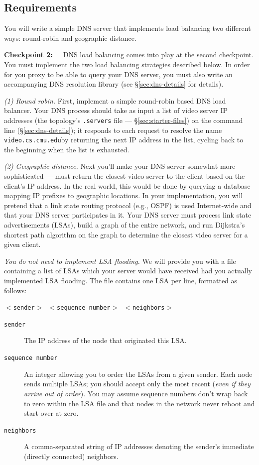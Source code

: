 \documentclass{article}
\newcommand{\theurl}{\texttt{video.cs.cmu.edu}}
\begin{document}
\subsection{Requirements}

You will write a simple DNS server that implements load balancing two different
ways: round-robin and geographic distance.

\bigskip \noindent \textbf{Checkpoint 2:}~~~DNS load balancing comes into play
at the second checkpoint. You must implement the two load balancing strategies
described below. In order for you proxy to be able to query your DNS server,
you must also write an accompanying DNS resolution library (see
\S\ref{sec:dns-details} for details).

\medskip \noindent \textit{(1) Round robin.} First, implement a simple
round-robin based DNS load balancer. Your DNS process should take as input a
list of video server IP addresses (the topology's \texttt{.servers} file ---
\S\ref{sec:starter-files}) on the command line (\S\ref{sec:dns-details}); it
responds to each request to resolve the name \theurl by returning the next IP
address in the list, cycling back to the beginning when the list is exhausted.

\medskip \noindent \textit{(2) Geographic distance.} Next you'll make your DNS
server somewhat more sophisticated --- must return the closest video server to
the client based on the client's IP address. In the real world, this would be
done by querying a database mapping IP prefixes to geographic locations. In
your implementation, you will pretend that a link state routing protocol (e.g.,
OSPF) is used Internet-wide and that your DNS server participates in it. Your
DNS server must process link state advertisements (LSAs), build a graph of the
entire network, and run Dijkstra's shortest path algorithm on the graph to
determine the closest video server for a given client.

\emph{You do not need to implement LSA flooding.} We will provide you with a
file containing a list of LSAs which your server would have received had you
actually implemented LSA flooding.  The file contains one LSA per line,
formatted as follows:
\begin{center}
	\texttt{$<$sender$>$ $<$sequence number$>$ $<$neighbors$>$}
\end{center}

\begin{description}
	\item[\texttt{sender}] The IP address of the node that originated this LSA. 
	\item[\texttt{sequence number}] An integer allowing you to order the LSAs
	from a given sender. Each node sends multiple LSAs; you should accept only
	the most recent (\emph{even if they arrive out of order}).  You may assume
	sequence numbers don't wrap back to zero within the LSA file and that nodes
	in the network never reboot and start over at zero.
	\item[\texttt{neighbors}] A comma-separated string of IP addresses denoting
	the sender's immediate (directly connected) neighbors. 
\end{description}
\end{document}
